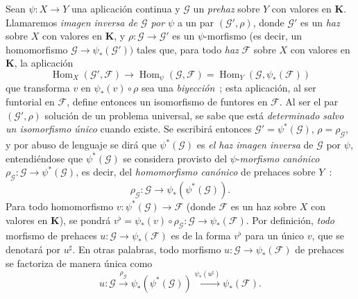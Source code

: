 \begin{env}[3.5.3]
\label{0.3.5.3-fr}
Sean $\psi:X\to Y$ una aplicación continua y $\mathcal{G}$ un
\emph{prehaz} sobre $Y$ con valores en $\boldsymbol{K}$. Llamaremos
\emph{imagen inversa de $\mathcal{G}$ por $\psi$} a un par
$(\mathcal{G}',\rho)$, donde $\mathcal{G}'$ es un \emph{haz} sobre $X$ con
valores en $\boldsymbol{K}$, y
$\rho:\mathcal{G}\to\mathcal{G}'$ es un $\psi$-morfismo (es decir, un
homomorfismo $\mathcal{G}\to\psi_*(\mathcal{G}'))$ tales que, para todo
\emph{haz} $\mathcal{F}$ sobre $X$ con valores en $\boldsymbol{K}$,
la aplicación
\begin{equation*}
  \operatorname{Hom}_X(\mathcal{G}',\mathcal{F})
  \longrightarrow \operatorname{Hom}_\psi(\mathcal{G},\mathcal{F})
  =\operatorname{Hom}_Y(\mathcal{G},\psi_*(\mathcal{F}))
\tag{3.5.3.1}\label{0.3.5.3.1-fr}
\end{equation*}
que transforma $v$ en $\psi_*(v)\circ\rho$ sea una \emph{biyección}~; esta
aplicación, al ser funtorial en $\mathcal{F}$, define entonces un
isomorfismo de funtores en $\mathcal{F}$. Al ser el par
$(\mathcal{G}',\rho)$ solución de un problema universal, se sabe que está
\emph{determinado salvo un isomorfismo único} cuando existe. Se escribirá
entonces $\mathcal{G}'=\psi^*(\mathcal{G})$, $\rho=\rho_{\mathcal{G}}$, y por
abuso de lenguaje se dirá que $\psi^*(\mathcal{G})$ es \emph{el haz imagen
inversa} de $\mathcal{G}$ por $\psi$, entendiéndose que
$\psi^*(\mathcal{G})$ se considera provisto del $\psi$-\emph{morfismo
canónico}
$\rho_{\mathcal{G}}:\mathcal{G}\to\psi^*(\mathcal{G})$, es decir, del
\emph{homomorfismo canónico} de prehaces sobre $Y$~:
\begin{equation*}
  \rho_{\mathcal{G}}:\mathcal{G}\to\psi_*(\psi^*(\mathcal{G})).
\tag{3.5.3.2}\label{0.3.5.3.2-fr}
\end{equation*}
Para todo homomorfismo
$v:\psi^*(\mathcal{G})\to\mathcal{F}$ (donde $\mathcal{F}$ es un haz sobre
$X$ con valores en $\boldsymbol{K}$), se pondrá
$v^\flat=\psi_*(v)\circ\rho_{\mathcal{G}}:
\mathcal{G}\to\psi_*(\mathcal{F})$. Por definición, \emph{todo} morfismo de
prehaces $u:\mathcal{G}\to\psi_*(\mathcal{F})$ es de la forma $v^\flat$ para
un único $v$, que se denotará por $u^\sharp$. En otras palabras, todo
morfismo $u:\mathcal{G}\to\psi_*(\mathcal{F})$ de prehaces se factoriza
de manera única como
\begin{equation*}
  u:\mathcal{G}\xrightarrow{\rho_{\mathcal{G}}}
  \psi_*(\psi^*(\mathcal{G}))
  \xrightarrow{\psi_*(u^\sharp)}\psi_*(\mathcal{F}).
\tag{3.5.3.3}\label{0.3.5.3.3-fr}
\end{equation*}
\end{env}
